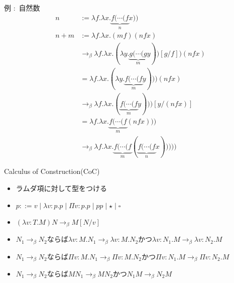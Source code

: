 \documentclass[18pt]{beamer}
\begin{document}
\begin{frame}{例 $\colon$ 自然数}
 \begin{align*}
 n & := \lambda f. \lambda x. \underbrace{f (\cdots (f}_{n} x)) \\
 n + m & := \lambda f. \lambda x. (m f) (n f x) \\
       & \rightarrow_\beta \lambda f. \lambda x. (\lambda y. \underbrace{g (\cdots (g}_{m} y))[g/f]) (n f x) \\
       & = \lambda f. \lambda x. (\lambda y. \underbrace{f (\cdots (f}_{m} y))) (n f x) \\
       & \rightarrow_\beta \lambda f. \lambda x. (\underbrace{f (\cdots (f}_{m} y)))[y/(n f x)] \\
       & = \lambda f. \lambda x. \underbrace{f (\cdots (f}_{m} (n f x))) \\
       & \rightarrow_\beta \lambda f. \lambda x. \underbrace{f (\cdots (f}_{m} (\underbrace{f (\cdots (f}_{n} x)))))
 \end{align*}
\end{frame}

\begin{frame}{Calculus of Construction(CoC)}
 \begin{itemize}
  \item ラムダ項に対して型をつける
  \item $p ::= v \mid \lambda v \colon p. p \mid \Pi v \colon p. p \mid p p \mid \star \mid \square$
  \item $(\lambda v \colon T. M) N \rightarrow_\beta M[N/v]$
  \item $N_1 \rightarrow_\beta N_2$ならば$\lambda v \colon M. N_1 \rightarrow_\beta \lambda v \colon M. N_2$かつ$\lambda v \colon N_1. M \rightarrow_\beta \lambda v \colon N_2. M$
  \item $N_1 \rightarrow_\beta N_2$ならば$\Pi v \colon M. N_1 \rightarrow_\beta \Pi v \colon M. N_2$かつ$\Pi v \colon N_1. M \rightarrow_\beta \Pi v \colon N_2. M$
  \item $N_1 \rightarrow_\beta N_2$ならば$M N_1 \rightarrow_\beta M N_2$かつ$N_1 M \rightarrow_\beta N_2 M$
 \end{itemize}
\end{frame}
\end{document}
